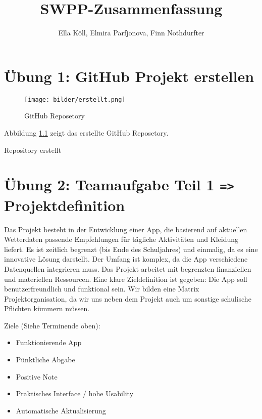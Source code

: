 \documentclass[a4paper,12pt]{report}
\title{SWPP-Zusammenfassung}
\author{Ella Köll, Elmira Parfjonova, Finn Nothdurfter}
\begin{document}
    \maketitle
    \tableofcontents



    \chapter{Übung 1: GitHub Projekt erstellen}

    \begin{figure}[h]
        \centering
        \texttt{[image: bilder/erstellt.png]}
        \caption{GitHub Reposetory}
        \label{fig:portrait}
    \end{figure}

    Abbildung \ref{fig:portrait} zeigt das erstellte GitHub Reposetory.

    Repository erstellt



    \chapter{Übung 2: Teamaufgabe Teil 1 \texttt{=>} Projektdefinition}
    

Das Projekt besteht in der Entwicklung einer App, die basierend auf aktuellen Wetterdaten passende Empfehlungen für tägliche Aktivitäten und Kleidung liefert. Es ist zeitlich begrenzt (bis Ende des Schuljahres) und einmalig, da es eine innovative Lösung darstellt. Der Umfang ist komplex, da die App verschiedene Datenquellen integrieren muss. Das Projekt arbeitet mit begrenzten finanziellen und materiellen Ressourcen. Eine klare Zieldefinition ist gegeben: Die App soll benutzerfreundlich und funktional sein.
Wir bilden eine Matrix Projektorganisation, da wir uns neben dem Projekt auch um sonstige schulische Pflichten kümmern müssen.


\vspace{1cm}


Ziele (Siehe Terminende oben):
\begin{itemize}[label=-] 
    \item Funktionierende App
    \item Pünktliche Abgabe
    \item Positive Note
    \item Praktisches Interface / hohe Usability
    \item Automatische Aktualisierung
\end{itemize}
\end{document}
